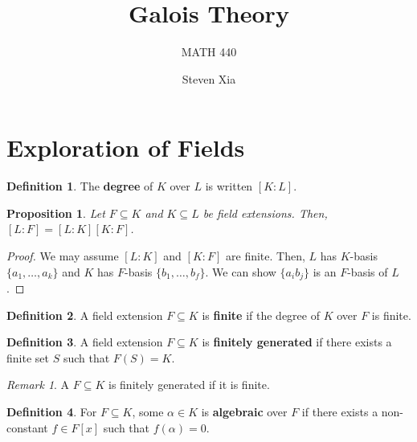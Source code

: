 \documentclass[
    parskip=half,
    toc=flat,
    toc=sectionentrydotfill,
]{scrartcl}  %
\title{Galois Theory}
\subtitle{MATH 440}
\author{Steven Xia}
\theoremstyle{definition}
\newtheorem{definition}{Definition}[section]
\theoremstyle{plain}
\newtheorem{proposition}{Proposition}[section]
\theoremstyle{remark}
\newtheorem{remark}{Remark}[section]
\begin{document}
\maketitle

\begin{minipage}{\textwidth} %
\begin{quote} 
\end{quote}
\end{minipage}

\tableofcontents


\section{Exploration of Fields}

\begin{definition}
    The \textbf{degree} of $K$ over $L$ is written $[K:L]$.
\end{definition}

\begin{proposition}
    Let $F\subseteq K$ and $K\subseteq L$ be field extensions.
    Then, $[L:F]=[L:K][K:F]$.
\end{proposition}

\begin{proof}
    We may assume $[L:K]$ and $[K:F]$ are finite.
    Then, $L$ has $K$-basis $\{a_1,\dots,a_k\}$ and $K$ has $F$-basis $\{b_1,\dots,b_f\}$.
    We can show $\{a_ib_j\}$ is an $F$-basis of $L$.
\end{proof}

\begin{definition}
    A field extension $F\subseteq K$ is \textbf{finite} if the degree of $K$
    over $F$ is finite.
\end{definition}

\begin{definition}
    A field extension $F\subseteq K$ is \textbf{finitely generated} if there
    exists a finite set $S$ such that $F(S)=K$.
\end{definition}

\begin{remark}
    \label{rem: finite implies finitely generated}
    A $F\subseteq K$ is finitely generated if it is finite.
\end{remark}

\begin{definition}
    For $F\subseteq K$, some $\alpha\in K$ is \textbf{algebraic} over $F$ if
    there exists a non-constant $f\in F[x]$ such that $f(\alpha)=0$.
\end{definition}
\end{document}
